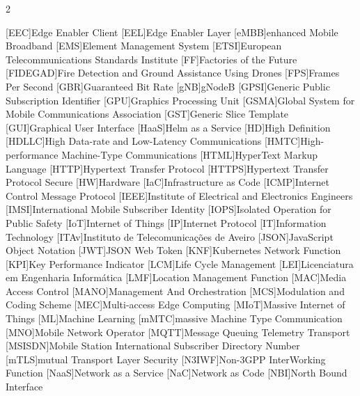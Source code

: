 \begin{multicols}{2}
\begin{acronym}[AAAAAAAAA]
	[EEC]{Edge Enabler Client}
	[EEL]{Edge Enabler Layer}
	[eMBB]{enhanced Mobile Broadband}
	[EMS]{Element Management System}
	[ETSI]{European Telecommunications Standards Institute}
	[FF]{Factories of the Future}
	[FIDEGAD]{Fire Detection and Ground Assistance Using Drones}
	[FPS]{Frames Per Second}
    [GBR]{Guaranteed Bit Rate}
	[gNB]{gNodeB}
    [GPSI]{Generic Public Subscription Identifier}
	[GPU]{Graphics Processing Unit}
	[GSMA]{Global System for Mobile Communications Association}
	[GST]{Generic Slice Template}
	[GUI]{Graphical User Interface}
    [HaaS]{Helm as a Service}
	[HD]{High Definition}
	[HDLLC]{High Data-rate and Low-Latency Communications}
	[HMTC]{High-performance Machine-Type Communications}
	[HTML]{HyperText Markup Language}
	[HTTP]{Hypertext Transfer Protocol}
    [HTTPS]{Hypertext Transfer Protocol Secure}
	[HW]{Hardware}
    [IaC]{Infrastructure as Code}
	[ICMP]{Internet Control Message Protocol}
    [IEEE]{Institute of Electrical and Electronics Engineers}
    [IMSI]{International Mobile Subscriber Identity}
	[IOPS]{Isolated Operation for Public Safety}
	[IoT]{Internet of Things}
	[IP]{Internet Protocol}
	[IT]{Information Technology}
	[ITAv]{Instituto de Telecomunicações de Aveiro}
	[JSON]{JavaScript Object Notation}
	[JWT]{\ac{JSON} Web Token}
	[KNF]{Kubernetes Network Function}
	[KPI]{Key Performance Indicator}
    [LCM]{Life Cycle Management}
	[LEI]{Licenciatura em Engenharia Informática}
	[LMF]{Location Management Function}
    [MAC]{Media Access Control}
	[MANO]{Management And Orchestration}
	[MCS]{Modulation and Coding Scheme}
	[MEC]{Multi-access Edge Computing}
	[MIoT]{Massive Internet of Things}
	[ML]{Machine Learning}
	[mMTC]{massive Machine Type Communication}
	[MNO]{Mobile Network Operator}
    [MQTT]{Message Queuing Telemetry Transport}
    [MSISDN]{Mobile Station International Subscriber Directory Number}
    [mTLS]{mutual Transport Layer Security}
	[N3IWF]{Non-3GPP InterWorking Function}
	[NaaS]{Network as a Service}
	[NaC]{Network as Code}
	[NBI]{North Bound Interface}

\end{acronym}
\end{multicols}
